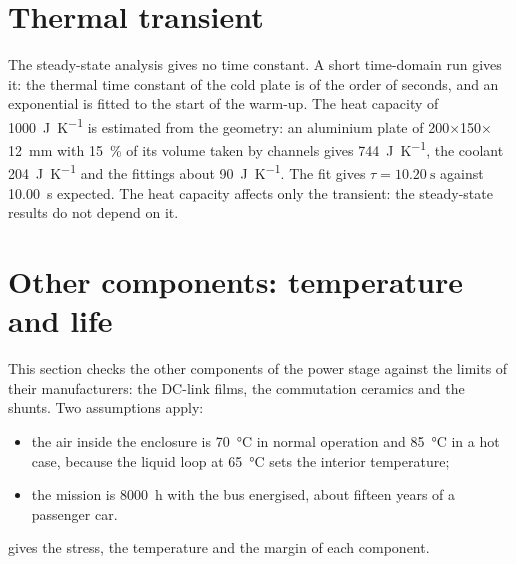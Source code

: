 \section{Thermal transient}

The steady-state analysis gives no time constant. A short time-domain run
gives it: the thermal time constant of the cold plate is of the order of
seconds, and an exponential is fitted to the start of the warm-up. The heat
capacity of \SI{1000}{\joule\per\kelvin} is estimated from the geometry: an
aluminium plate of \SI{200}{}$\times$\SI{150}{}$\times$\SI{12}{\milli\metre}
with \SI{15}{\percent} of its volume taken by channels gives
\SI{744}{\joule\per\kelvin}, the coolant \SI{204}{\joule\per\kelvin} and the
fittings about \SI{90}{\joule\per\kelvin}. The fit gives
$\tau = \SI{10.20}{\second}$ against \SI{10.00}{\second} expected. The heat
capacity affects only the transient: the steady-state results do not depend
on it.

\section{Other components: temperature and life}
\label{sec:complife}

This section checks the other components of the power stage against the
limits of their manufacturers: the DC-link films, the commutation ceramics
and the shunts. Two assumptions apply:
\begin{itemize}
  \item the air inside the enclosure is \SI{70}{\celsius} in normal operation
        and \SI{85}{\celsius} in a hot case, because the liquid loop at
        \SI{65}{\celsius} sets the interior temperature;
  \item the mission is \SI{8000}{\hour} with the bus energised, about fifteen
        years of a passenger car.
\end{itemize}
 gives the stress, the temperature and the margin of each
component.

